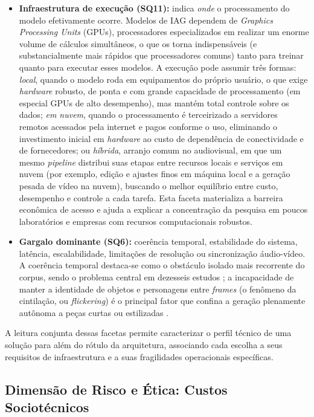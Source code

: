 \begin{itemize}
    \item \textbf{Infraestrutura de execução (SQ11):} indica \textit{onde} o processamento do modelo efetivamente ocorre. Modelos de IAG dependem de \textit{Graphics Processing Units} (GPUs), processadores especializados em realizar um enorme volume de cálculos simultâneos, o que os torna indispensáveis (e substancialmente mais rápidos que processadores comuns) tanto para treinar quanto para executar esses modelos. A execução pode assumir três formas: \textit{local}, quando o modelo roda em equipamentos do próprio usuário, o que exige \textit{hardware} robusto, de ponta e com grande capacidade de processamento (em especial GPUs de alto desempenho), mas mantém total controle sobre os dados; \textit{em nuvem}, quando o processamento é terceirizado a servidores remotos acessados pela internet e pagos conforme o uso, eliminando o investimento inicial em \textit{hardware} ao custo de dependência de conectividade e de fornecedores; ou \textit{híbrida}, arranjo comum no audiovisual, em que um mesmo \textit{pipeline} distribui suas etapas entre recursos locais e serviços em nuvem (por exemplo, edição e ajustes finos em máquina local e a geração pesada de vídeo na nuvem), buscando o melhor equilíbrio entre custo, desempenho e controle a cada tarefa. Esta faceta materializa a barreira econômica de acesso e ajuda a explicar a concentração da pesquisa em poucos laboratórios e empresas com recursos computacionais robustos.
    \item \textbf{Gargalo dominante (SQ6):} coerência temporal, estabilidade do sistema, latência, escalabilidade, limitações de resolução ou sincronização áudio-vídeo. A coerência temporal destaca-se como o obstáculo isolado mais recorrente do corpus, sendo o problema central em dezesseis estudos \citep{RothAleo2026}; a incapacidade de manter a identidade de objetos e personagens entre \textit{frames} (o fenômeno da cintilação, ou \textit{flickering}) é o principal fator que confina a geração plenamente autônoma a peças curtas ou estilizadas \citep{gavran2025, orak2024}.
\end{itemize}

A leitura conjunta dessas facetas permite caracterizar o perfil técnico de uma solução para além do rótulo da arquitetura, associando cada escolha a seus requisitos de infraestrutura e a suas fragilidades operacionais específicas.

\subsection{Dimensão de Risco e Ética: Custos Sociotécnicos}

